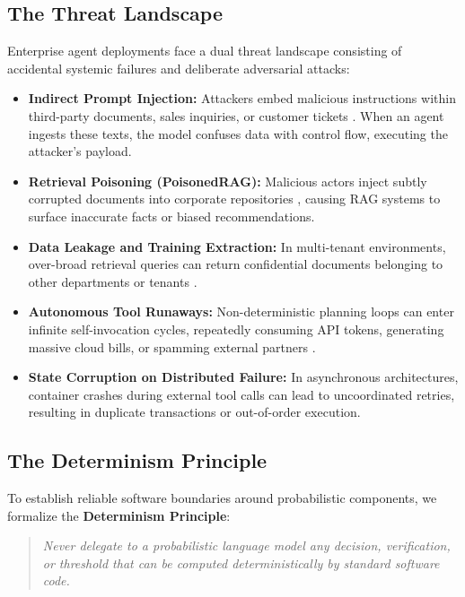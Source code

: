 \documentclass[10pt,a4paper,twocolumn]{article}
\begin{document}
\subsection{The Threat Landscape}
Enterprise agent deployments face a dual threat landscape consisting of accidental systemic failures and deliberate adversarial attacks:
\begin{itemize}[leftmargin=*]
  \item \textbf{Indirect Prompt Injection:} Attackers embed malicious instructions within third-party documents, sales inquiries, or customer tickets \cite{greshake2023indirect,zhan2024injecagent}. When an agent ingests these texts, the model confuses data with control flow, executing the attacker's payload.
  \item \textbf{Retrieval Poisoning (PoisonedRAG):} Malicious actors inject subtly corrupted documents into corporate repositories \cite{zou2024poisonedrag}, causing RAG systems to surface inaccurate facts or biased recommendations.
  \item \textbf{Data Leakage and Training Extraction:} In multi-tenant environments, over-broad retrieval queries can return confidential documents belonging to other departments or tenants \cite{carlini2021extracting}.
  \item \textbf{Autonomous Tool Runaways:} Non-deterministic planning loops can enter infinite self-invocation cycles, repeatedly consuming API tokens, generating massive cloud bills, or spamming external partners \cite{ruan2024toolemu,yao2024taubench}.
  \item \textbf{State Corruption on Distributed Failure:} In asynchronous architectures, container crashes during external tool calls can lead to uncoordinated retries, resulting in duplicate transactions or out-of-order execution.
\end{itemize}

\subsection{The Determinism Principle}
To establish reliable software boundaries around probabilistic components, we formalize the \textbf{Determinism Principle}:

\begin{quote}
\emph{Never delegate to a probabilistic language model any decision, verification, or threshold that can be computed deterministically by standard software code.}
\end{quote}
\end{document}
